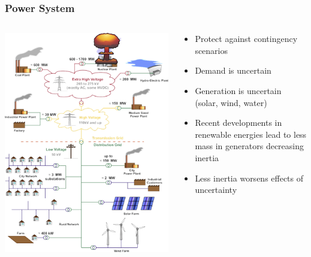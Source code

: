 \begin{frame}
  \frametitle{Power System}
  \begin{columns}
    \begin{column}{0.45\textwidth}
      \includegraphics[width=\textwidth]{figures/slides.png}
    \end{column}
    \begin{column}{0.45\textwidth}
      \begin{center}
      \end{center}
      \begin{itemize}
        \item Protect against contingency scenarios
        \item Demand is uncertain
        \item Generation is uncertain (solar, wind, water)
        \item Recent developments in renewable energies lead to less mass in generators decreasing inertia
        \item Less inertia worsens effects of uncertainty
      \end{itemize}
    \end{column}
  \end{columns}
\end{frame}

